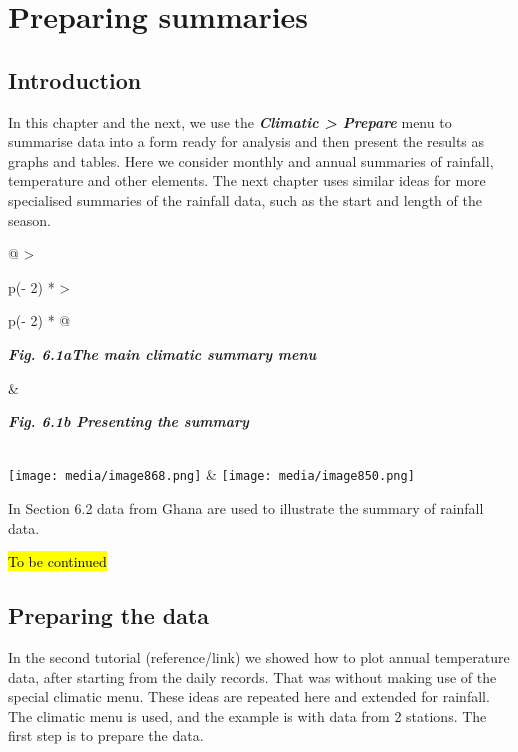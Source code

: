 \documentclass[
  letterpaper,
  DIV=11,
  numbers=noendperiod]{scrreprt}
\begin{document}
\chapter{Preparing summaries}\label{preparing-summaries}

\section{Introduction}\label{introduction-4}

In this chapter and the next, we use the \textbf{\emph{Climatic
\textgreater{} Prepare}} menu to summarise data into a form ready for
analysis and then present the results as graphs and tables. Here we
consider monthly and annual summaries of rainfall, temperature and other
elements. The next chapter uses similar ideas for more specialised
summaries of the rainfall data, such as the start and length of the
season.

\begin{longtable}[]{@{}
  >{\raggedright\arraybackslash}p{(\columnwidth - 2\tabcolsep) * }
  >{\raggedright\arraybackslash}p{(\columnwidth - 2\tabcolsep) * }@{}}
\toprule\noalign{}
\begin{minipage}[b]{\linewidth}\raggedright
\textbf{\emph{Fig. 6.1aThe main climatic summary menu}}
\end{minipage} & \begin{minipage}[b]{\linewidth}\raggedright
\textbf{\emph{Fig. 6.1b Presenting the summary}}
\end{minipage} \\
\midrule\noalign{}
\endhead
\bottomrule\noalign{}
\endlastfoot
\texttt{[image: media/image868.png]} &
\texttt{[image: media/image850.png]} \\
\end{longtable}

In Section 6.2 data from Ghana are used to illustrate the summary of
rainfall data.

\hl{To be continued}

\section{Preparing the data}\label{preparing-the-data}

In the second tutorial (reference/link) we showed how to plot annual
temperature data, after starting from the daily records. That was
without making use of the special climatic menu. These ideas are
repeated here and extended for rainfall. The climatic menu is used, and
the example is with data from 2 stations. The first step is to prepare
the data.
\end{document}
